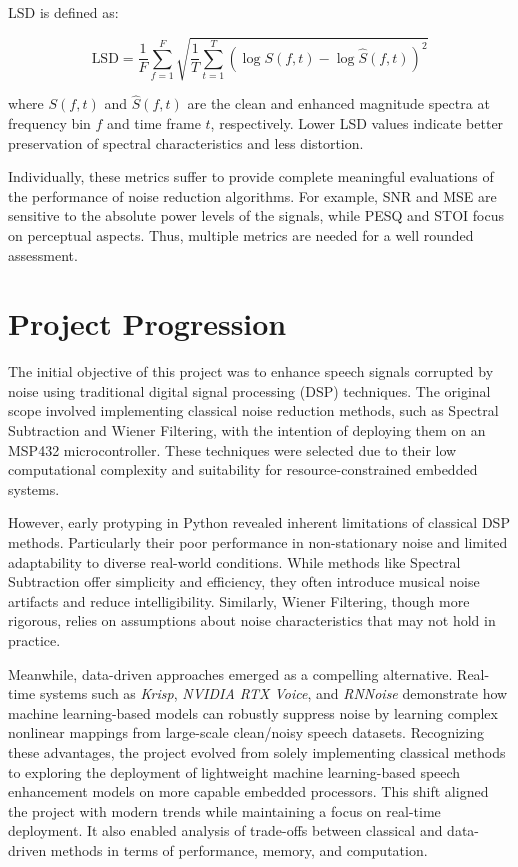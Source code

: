 LSD is defined as:

\begin{equation}
    \text{LSD} = \frac{1}{F} \sum_{f=1}^{F} \sqrt{ \frac{1}{T} \sum_{t=1}^{T} \left( \log S(f, t) - \log \hat{S}(f, t) \right)^2 }
\end{equation}

where \( S(f, t) \) and \( \hat{S}(f, t) \) are the clean and enhanced magnitude spectra at frequency bin \( f \) and time frame \( t \), respectively. Lower LSD values indicate better preservation of spectral characteristics and less distortion.

\vspace{2em}
Individually, these metrics suffer to provide complete meaningful evaluations of the performance of noise reduction algorithms. For example, SNR and MSE are sensitive to the absolute power levels of the signals, while PESQ and STOI focus on perceptual aspects. Thus, multiple metrics are needed for a well rounded assessment.


\section{Project Progression}
\label{sec:project_progression}

The initial objective of this project was to enhance speech signals corrupted by noise using traditional digital signal processing (DSP) techniques. The original scope involved implementing classical noise reduction methods, such as Spectral Subtraction and Wiener Filtering, with the intention of deploying them on an MSP432 microcontroller. These techniques were selected due to their low computational complexity and suitability for resource-constrained embedded systems.

However, early protyping in Python revealed inherent limitations of classical DSP methods. Particularly their poor performance in non-stationary noise and limited adaptability to diverse real-world conditions. While methods like Spectral Subtraction offer simplicity and efficiency, they often introduce musical noise artifacts and reduce intelligibility. Similarly, Wiener Filtering, though more rigorous, relies on assumptions about noise characteristics that may not hold in practice.

Meanwhile, data-driven approaches emerged as a compelling alternative. Real-time systems such as \textit{Krisp}, \textit{NVIDIA RTX Voice}, and \textit{RNNoise} demonstrate how machine learning-based models can robustly suppress noise by learning complex nonlinear mappings from large-scale clean/noisy speech datasets. Recognizing these advantages, the project evolved from solely implementing classical methods to exploring the deployment of lightweight machine learning-based speech enhancement models on more capable embedded processors. This shift aligned the project with modern trends while maintaining a focus on real-time deployment. It also enabled analysis of trade-offs between classical and data-driven methods in terms of performance, memory, and computation.

